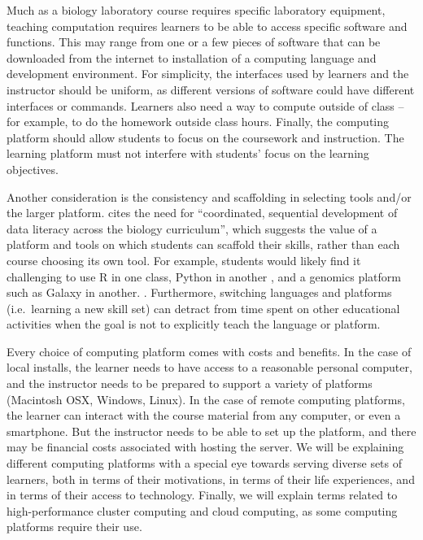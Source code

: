 Much as a biology laboratory course requires specific laboratory equipment, teaching computation requires learners to be able to access specific software and functions.
This may range from one or a few pieces of software that can be downloaded from the internet
to installation of a computing language and development environment.
For simplicity,
the interfaces used by learners and the instructor should be uniform, as different versions of software could have different interfaces or commands.
Learners also need  a way to compute outside of class -- for example, to do the homework outside class hours.
Finally, the computing platform should allow students to focus on the coursework and instruction. 
The learning platform must not interfere with students' focus on the learning objectives.

Another consideration is the consistency and scaffolding in selecting tools and/or the larger platform.
\citet{Gibson18} cites the need for ``coordinated, sequential development of data literacy across the biology curriculum'',
which suggests the value of a platform and tools on which students can scaffold their skills,
rather than each course choosing its own tool.
For example, students would likely find it challenging to use R in one class,
Python in another \citep{wu1990}, and a genomics platform such as Galaxy in another.
  . Furthermore, switching languages and platforms (i.e.\ learning a new skill set)
can detract from time spent on other educational activities when the goal is not to explicitly teach the language or platform.

Every choice of computing platform comes with costs and benefits. 
In the case of local installs, the learner needs to have access to a reasonable personal computer, and the instructor needs to be prepared to support a variety of platforms (Macintosh OSX, Windows, Linux). 
In the case of remote computing platforms, the learner can interact with the course material from any computer, or even a smartphone.
But the instructor needs to be able to set up the platform, and there may be financial costs associated with hosting the server.
We will be explaining different computing platforms with a special eye towards serving diverse sets of learners, both in terms of their motivations, in terms of their life experiences, and in terms of their access to technology.
Finally, we will explain terms related to high-performance cluster computing and cloud computing, as some computing platforms require their use.

